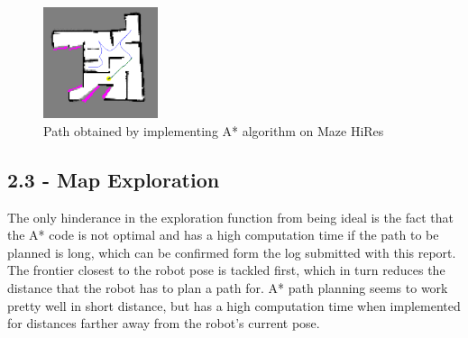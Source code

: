 \documentclass[journal,onecolumn]{IEEEtran}
\begin{document}
\begin{figure}[H]
\centering
\includegraphics[width=0.3\textwidth]{Media/22.png}
\caption{Path obtained by implementing A* algorithm on Maze HiRes}
\end{figure}

\subsection*{2.3 - Map Exploration} 

The only hinderance in the exploration function from being ideal is the fact that the A* code is not optimal and has a high computation time if the path to be planned is long, which can be confirmed form the log submitted with this report. The frontier closest to the robot pose is tackled first, which in turn reduces the distance that the robot has to plan a path for. A* path planning seems to work pretty well in short distance, but has a high computation time when implemented for distances farther away from the robot's current pose. 



\ifCLASSOPTIONcaptionsoff
  \newpage
\fi

\nocite{*}


\end{document}
